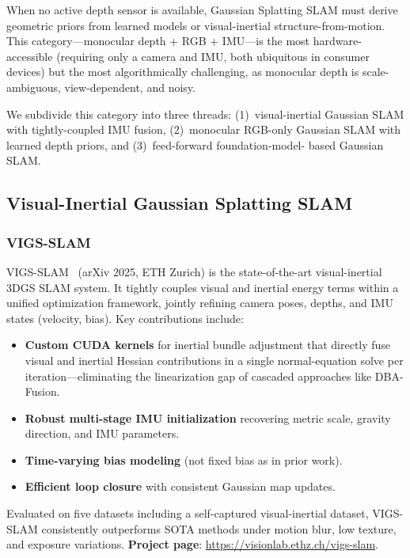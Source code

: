 When no active depth sensor is available, Gaussian Splatting SLAM must
derive geometric priors from learned models or visual-inertial
structure-from-motion.  This category---monocular depth + RGB + IMU---is the
most hardware-accessible (requiring only a camera and IMU, both ubiquitous
in consumer devices) but the most algorithmically challenging, as monocular
depth is scale-ambiguous, view-dependent, and noisy.

We subdivide this category into three threads: (1)~visual-inertial
Gaussian SLAM with tightly-coupled IMU fusion, (2)~monocular RGB-only
Gaussian SLAM with learned depth priors, and (3)~feed-forward foundation-model-
based Gaussian SLAM.

\subsection{Visual-Inertial Gaussian Splatting SLAM}

\subsubsection{VIGS-SLAM}

VIGS-SLAM~\cite{zhu2026_vigssslam} (arXiv 2025, ETH Zurich) is the
state-of-the-art visual-inertial 3DGS SLAM system.  It tightly couples
visual and inertial energy terms within a unified optimization framework,
jointly refining camera poses, depths, and IMU states (velocity, bias).
Key contributions include:
\begin{itemize}
    \item \textbf{Custom CUDA kernels} for inertial bundle adjustment that
    directly fuse visual and inertial Hessian contributions in a single
    normal-equation solve per iteration---eliminating the linearization gap
    of cascaded approaches like DBA-Fusion.
    \item \textbf{Robust multi-stage IMU initialization} recovering metric
    scale, gravity direction, and IMU parameters.
    \item \textbf{Time-varying bias modeling} (not fixed bias as in prior
    work).
    \item \textbf{Efficient loop closure} with consistent Gaussian map
    updates.
\end{itemize}
Evaluated on five datasets including a self-captured visual-inertial
dataset, VIGS-SLAM consistently outperforms SOTA methods under motion blur,
low texture, and exposure variations.  \textbf{Project page}:
\url{https://visionlab.ethz.ch/vigs-slam}.

